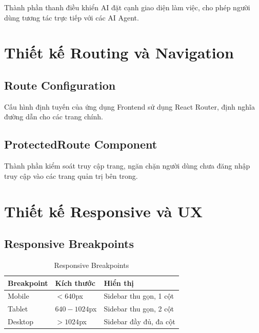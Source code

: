 \documentclass[12pt,a4paper]{report}
\begin{document}
Thành phần thanh điều khiển AI đặt cạnh giao diện làm việc, cho phép người dùng tương tác trực tiếp với các AI Agent.

\section{Thiết kế Routing và Navigation}

\subsection{Route Configuration}

Cấu hình định tuyến của ứng dụng Frontend sử dụng React Router, định nghĩa đường dẫn cho các trang chính.

\subsection{ProtectedRoute Component}

Thành phần kiểm soát truy cập trang, ngăn chặn người dùng chưa đăng nhập truy cập vào các trang quản trị bên trong.

\section{Thiết kế Responsive và UX}

\subsection{Responsive Breakpoints}

\begin{table}[H]
\centering
\caption{Responsive Breakpoints}
\begin{tabular}{|p{3.5cm}|p{4cm}|p{7cm}|}
\hline
\textbf{Breakpoint} & \textbf{Kích thước} & \textbf{Hiển thị} \\
\hline
Mobile & $< 640$px & Sidebar thu gọn, 1 cột \\
\hline
Tablet & $640 - 1024$px & Sidebar thu gọn, 2 cột \\
\hline
Desktop & $> 1024$px & Sidebar đầy đủ, đa cột \\
\hline
\end{tabular}
\label{tab:responsive_breakpoints}
\end{table}
\end{document}
